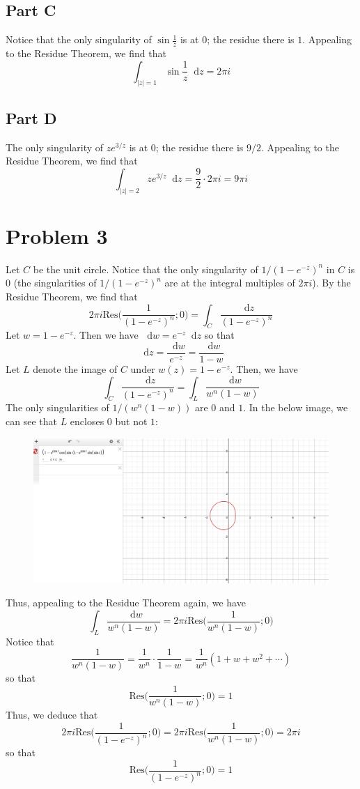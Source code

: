 \documentclass[12pt]{article}
\newcommand*\diff{\mathop{}\!\mathrm{d}}
\begin{document}
\subsection*{Part C}
Notice that the only singularity of $\sin \frac{1}{z}$ is at $0$; the residue there is $1$. Appealing to the Residue Theorem, we find that
\[
\int_{\vert z \vert = 1} \sin \frac{1}{z} \diff z = 2\pi i 
\]
\subsection*{Part D}
The only singularity of $ze^{3/z}$ is at $0$; the residue there is $9/2$. Appealing to the Residue Theorem, we find that
\[
\int_{\vert z \vert = 2} ze^{3/z} \diff z = \frac{9}{2} \cdot 2 \pi i = 9 \pi i
\]
\newpage
\section*{Problem 3}
Let $C$ be the unit circle. Notice that the only singularity of $1/(1-e^{-z})^n$ in $C$ is $0$ (the singularities of $1/(1-e^{-z})^n$ are at the integral multiples of $2\pi i$). By the Residue Theorem, we find that
\[
2\pi i \text{Res}\bigg(\frac{1}{(1-e^{-z})^n}; 0\bigg) = \int_C \frac{\diff z}{(1-e^{-z})^n}
\] Let $w =  1 - e^{-z}$. Then we have $\diff w  = e^{-z} \diff z$ so that
\[
\diff z = \frac{\diff w}{e^{-z}} = \frac{\diff w}{1-w}
\] Let $L$ denote the image of $C$ under $w(z) = 1-e^{-z}$.  Then, we have
\[
\int_C \frac{\diff z}{(1-e^{-z})^n} = \int_L \frac{\diff w}{w^n(1-w)}
\] The only singularities of $1/(w^n(1-w))$ are $0$ and $1$. In the below image, we can see that $L$ encloses $0$ but not $1$:
 \begin{figure}[H]
\centering
\includegraphics[width=\textwidth]{Image1}
\end{figure}
\noindent Thus, appealing to the Residue Theorem again, we have
\[
\int_L \frac{\diff w}{w^n(1-w)} = 2\pi  i \text{Res}\bigg( \frac{1}{w^n(1-w)}; 0 \bigg)
\] Notice that
\[
\frac{1}{w^n(1-w)} = \frac{1}{w^n} \cdot \frac{1}{1-w}  = \frac{1}{w^n}(1+w+w^2 +\cdots )
\] so that 
\[
\text{Res}\bigg( \frac{1}{w^n(1-w)}; 0 \bigg) = 1
\] Thus, we deduce that
\[
2\pi i \text{Res}\bigg(\frac{1}{(1-e^{-z})^n}; 0\bigg) = 2\pi  i \text{Res}\bigg( \frac{1}{w^n(1-w)}; 0 \bigg) = 2\pi i 
\] so that
\[
\text{Res}\bigg(\frac{1}{(1-e^{-z})^n}; 0\bigg) = 1
\]
\end{document}
